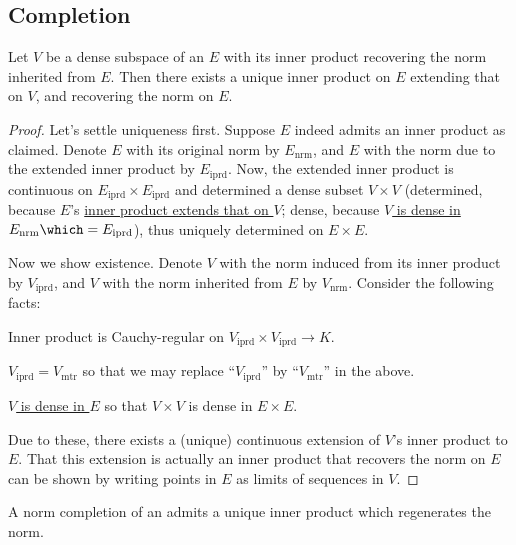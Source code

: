 	

\subsection{Completion}
	
	\begin{lem}
		Let $V$ be a dense subspace of an \IPS $E$ with its inner product recovering the norm inherited from $E$. Then there exists a unique inner product on $E$ extending that on $V$, and recovering the norm on $E$.
	\end{lem}
	
	\begin{proof}
		Let's settle uniqueness first. Suppose $E$ indeed admits an inner product as claimed. Denote $E$ with its original norm by $E_\text{nrm}$, and $E$ with the norm due to the extended inner product by $E_\text{iprd}$. Now, the extended inner product is continuous on $E_\text{iprd}\times E_\text{iprd}$ and determined a dense subset $V\times V$ (determined, because $E$'s \uline{inner product extends that on $V$}; dense, because \uline{$V$ is dense in $E_\text{nrm}\which = E_\text{iprd}$}), thus uniquely determined on $E\times E$.
		
		Now we show existence. Denote $V$ with the norm induced from its inner product by $V_\text{iprd}$, and $V$ with the norm inherited from $E$ by $V_\text{nrm}$. Consider the following facts:
		\begin{mylist}
			\item Inner product is Cauchy-regular on $V_\text{iprd}\times V_\text{iprd}\to K$.
			
			\item $V_\text{iprd} = V_\text{mtr}$ so that we may replace ``$V_\text{iprd}$'' by ``$V_\text{mtr}$'' in the above.
			
			\item \uline{$V$ is dense in $E$} so that $V\times V$ is dense in $E\times E$.
		\end{mylist}
		Due to these, there exists a (unique) continuous extension of $V$'s inner product to $E$. That this extension is actually an inner product that recovers the norm on $E$ can be shown by writing points in $E$ as limits of sequences in $V$.
	\end{proof}
	
	
	\begin{cor}
		A norm completion of an \IPS admits a unique inner product which regenerates the norm.
	\end{cor}
	
